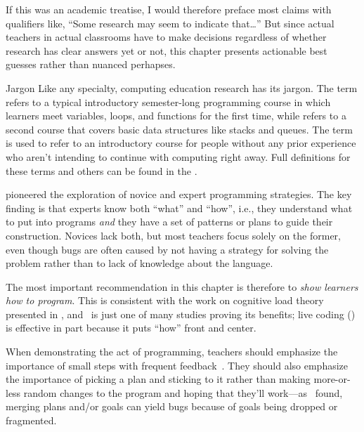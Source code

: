 If this was an academic treatise,
I would therefore preface most claims with qualifiers like,
``Some research may seem to indicate that{\ldots}''
But since actual teachers in actual classrooms have to make decisions
regardless of whether research has clear answers yet or not,
this chapter presents actionable best guesses rather than nuanced perhapses.

\begin{aside}{Jargon}
  Like any specialty,
  computing education research has its jargon.
  The term  refers to a typical introductory semester-long programming course
  in which learners meet variables, loops, and functions for the first time,
  while  refers to a second course
  that covers basic data structures like stacks and queues.
  The term  is used to refer to an introductory course
  for people without any prior experience
  who aren't intending to continue with computing right away.
  Full definitions for these terms and others can be found in
  the .
\end{aside}


\cite{Solo1984,Solo1986} pioneered the exploration of novice and expert programming strategies.
The key finding is that experts know both ``what'' and ``how'',
i.e.,
they understand what to put into programs
\emph{and} they have a set of patterns or plans to guide their construction.
Novices lack both,
but most teachers focus solely on the former,
even though bugs are often caused by not having a strategy for solving the problem
rather than to lack of knowledge about the language.

The most important recommendation in this chapter is therefore to \emph{show learners how to program}. This is consistent with the work on cognitive load theory presented in , and~\cite{Mull2007b} is just one of many studies proving its benefits; live coding () is effective in part because it puts ``how'' front and center.

When demonstrating the act of programming, teachers should emphasize the importance of small steps with frequent feedback~\cite{Blik2014}. They should also emphasize the importance of picking a plan and sticking to it rather than making more-or-less random changes to the program and hoping that they'll work---as~\cite{Spoh1985} found, merging plans and/or goals can yield bugs because of goals being dropped or fragmented.

